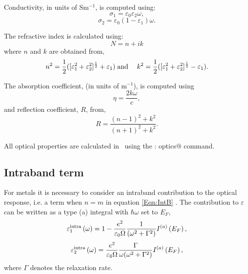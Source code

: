 \documentclass[a4paper,11pt,twoside]{book}
\begin{document}
{Conductivity, in units of Sm$^{-1}$, is computed using:
\begin{equation}
\sigma_1 = \varepsilon_0 \varepsilon_2 \omega, 
\end{equation}
\begin{equation}
\sigma_2 = \varepsilon_0 \left ( 1 - \varepsilon_1 \right ) \omega.
\end{equation}

The refractive index is calculated using:
\begin{equation}
N=n+ik
\end{equation}
where $n$ and $k$ are obtained from,
\begin{eqnarray}
n^2=\frac{1}{2}([\varepsilon_1^2+\varepsilon_2^2]^{\frac{1}{2}}+\varepsilon_1)
& {\rm \;and\;}&
k^2=\frac{1}{2}([\varepsilon_1^2+\varepsilon_2^2]^{\frac{1}{2}}-\varepsilon_1).
\end{eqnarray}


The absorption coefficient, (in units of m$^{-1}$), is computed using
\begin{equation}
\eta = \frac{2k\omega}{c},
\end{equation}
and reflection coefficient, $R$, from,
\begin{equation}
R= \frac{(n-1)^2 + k^2}{(n+1)^2+k^2}.
\end{equation}

All optical properties are calculated in \optados\ using the \verb@task : optics@ command.

\subsection{Intraband term}
For metals it is necessary to consider an intraband contribution to
the optical response, i.e. a term when $n = m$ in equation
\ref{Eqn:IntB}  \cite{dressel,draxl}.  The contribution to
$\varepsilon$ can be written as a type (a) integral with $\hbar\omega$
set to $E_F$, 
\begin{equation}
\varepsilon_1^{\rm{intra}} \left ( \omega \right ) = 1 - \frac{e^2}{\varepsilon_0 \Omega} \frac{1}{(\omega^2+\Gamma^2)} I^{(a)}\left ( E_F \right ),
\end{equation}
\begin{equation}
\varepsilon_2^{\rm{intra}} \left ( \omega \right ) = \frac{e^2}{\varepsilon_0 \Omega}\frac{\Gamma}{\omega (\omega^2+\Gamma^2)} I^{(a)}\left ( E_F \right ),
\end{equation}
where $\Gamma$ denotes the relaxation rate.  



}
\end{document}

